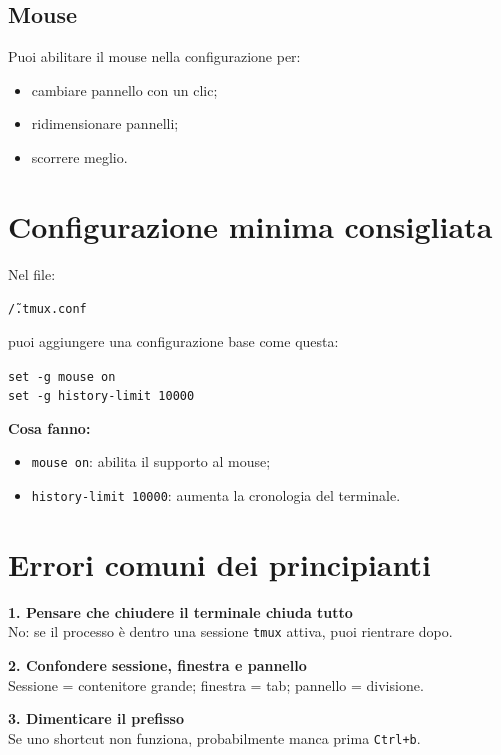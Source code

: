 \documentclass[a4paper,11pt]{article}
\begin{document}
\subsection{Mouse}
Puoi abilitare il mouse nella configurazione per:
\begin{itemize}[leftmargin=1.2cm]
    \item cambiare pannello con un clic;
    \item ridimensionare pannelli;
    \item scorrere meglio.
\end{itemize}

\section{Configurazione minima consigliata}
Nel file:
\begin{codebox}
\texttt{\~/.tmux.conf}
\end{codebox}

puoi aggiungere una configurazione base come questa:

\begin{codebox}
\texttt{set -g mouse on} \\
\texttt{set -g history-limit 10000}
\end{codebox}

\textbf{Cosa fanno:}
\begin{itemize}[leftmargin=1.2cm]
    \item \texttt{mouse on}: abilita il supporto al mouse;
    \item \texttt{history-limit 10000}: aumenta la cronologia del terminale.
\end{itemize}

\section{Errori comuni dei principianti}
\begin{infobox}
\textbf{1. Pensare che chiudere il terminale chiuda tutto} \\
No: se il processo è dentro una sessione \texttt{tmux} attiva, puoi rientrare dopo.

\medskip
\textbf{2. Confondere sessione, finestra e pannello} \\
Sessione = contenitore grande; finestra = tab; pannello = divisione.

\medskip
\textbf{3. Dimenticare il prefisso} \\
Se uno shortcut non funziona, probabilmente manca prima \texttt{Ctrl+b}.
\end{infobox}
\end{document}
